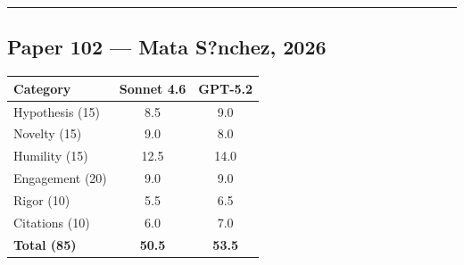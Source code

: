 \documentclass[11pt]{article}
\begin{document}
\bigskip
\hrule
\bigskip

\subsection*{Paper 102 --- Mata S?nchez, 2026}

\medskip

\begin{tabular}{lcc}
\toprule
\textbf{Category} & \textbf{Sonnet 4.6} & \textbf{GPT-5.2} \\
\midrule
Hypothesis (15) & 8.5 & 9.0 \\
Novelty (15) & 9.0 & 8.0 \\
Humility (15) & 12.5 & 14.0 \\
Engagement (20) & 9.0 & 9.0 \\
Rigor (10) & 5.5 & 6.5 \\
Citations (10) & 6.0 & 7.0 \\
\midrule
\textbf{Total (85)} & \textbf{50.5} & \textbf{53.5} \\
\bottomrule
\end{tabular}

\bigskip
\end{document}
